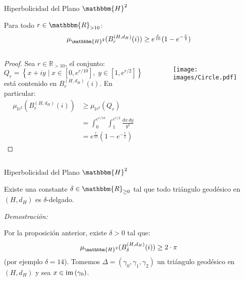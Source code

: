 \documentclass[xcolor=dvipsnames,aspectratio=159]{beamer}
\theoremstyle{largebreak}
\newcommand{\bbm}[1]{\ensuremath{\mathbbm{#1}}}
\newcommand{\im}[1]{\ensuremath{\textup{im}\left(#1\right)}}
\begin{document}

\begin{frame}{Hiperbolicidad del Plano $\bbm{H}^2$}
    \begin{propo}
        Para todo $r\in\bbm{R}_{>10}$:
        \begin{equation*}
            \mu_{\bbm{H}^2}(B_r^{(H,d_H)}(i))\geq e^{\frac{r}{10}}(1-e^{-\frac{r}{2}})
        \end{equation*}
    \end{propo}
    
  \begin{columns}
    \begin{proof}
      \pause
      Sea $r \in \mathbb{R}_{>10}$, el conjunto:
      \begin{equation*}
        Q_r = \left\{ x + iy \; \Big| \; x \in [0, e^{r/10}], \; y \in [1, e^{r/2}] \right\}
      \end{equation*}
      está contenido en $B_r^{(H, d_H)}(i)$. En particular:
      \pause
      \begin{equation*}
        \begin{split}
          \mu_{\mathbb{H}^2}(B_r^{(H, d_H)}(i)) &\geq \mu_{\mathbb{H}^2}(Q_r) \\
          &= \int_{0}^{e^{r/10}} \int_{1}^{e^{r/2}} \frac{dx\,dy}{y^2} \\
          &= e^{\frac{r}{10}} \left(1 - e^{-\frac{r}{2}} \right)
        \end{split}
      \end{equation*}
    \end{proof}

    \begin{figure}
      \centering
      \texttt{[image: images/Circle.pdf]}
    \end{figure}
  \end{columns}
\end{frame}

\begin{frame}{Hiperbolicidad del Plano $\bbm{H}^2$}
    \begin{theor}
        Existe una constante $\delta\in\bbm{R}_{\geq0}$ tal que todo triángulo geodésico en $(H,d_H)$ es $\delta$-delgado.
    \end{theor}

    \pause

    \textit{Demostración:}

    Por la proposición anterior, existe $\delta>0$ tal que:
    \begin{equation*}
        \mu_{\bbm{H}^2}(B_\delta^{(H,d_H)}(i))\geq 2\cdot\pi
    \end{equation*}
    \pause
    (por ejemplo $\delta=14$).
    \pause
    Tomemos $\Delta=(\gamma_0,\gamma_1,\gamma_2)$ un triángulo geodésico en $(H,d_H)$ y sea $x\in\im{\gamma_0}$.
\end{frame}
\end{document}
